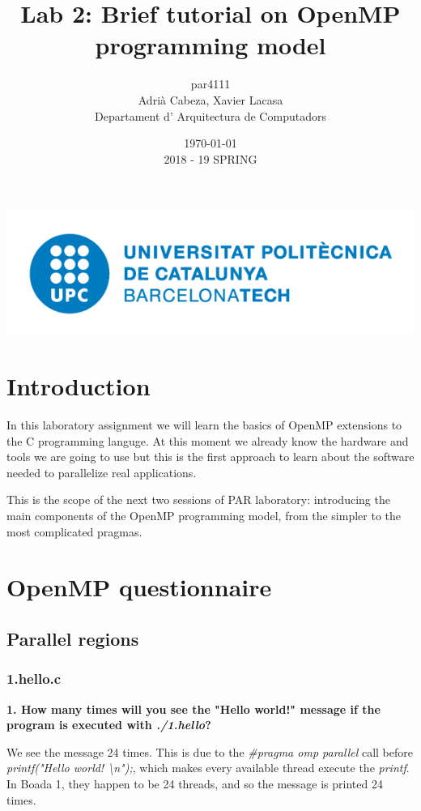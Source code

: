 \documentclass[12]{article}
\author{par4111 \\ Adrià Cabeza, Xavier Lacasa \\ Departament d' Arquitectura de Computadors}
\title{Lab 2: Brief tutorial on OpenMP programming model }
\date{\today \\ 2018 - 19 SPRING}
\begin{document}
\maketitle

\vspace*{\fill}
\begin{center}
\includegraphics[scale=0.5]{images/UPClogo.png}
\end{center}
\newpage
\tableofcontents
\newpage
\section{Introduction}

In this laboratory assignment we will learn the basics of OpenMP extensions to the C programming languge. At this moment we already know the hardware and tools we are going to use but this is the first approach to learn about the software needed to parallelize real applications. 

This is the scope of the next two sessions of PAR laboratory: introducing the  main components of the OpenMP programming model, from the simpler to the most complicated pragmas. 

\section{OpenMP questionnaire}

\subsection{Parallel regions}
\subsubsection{1.hello.c}
\textbf{1. How many times will you see the "Hello world!" message if the program is executed with \textit{./1.hello}?}

We see the message 24 times. This is due to the \textit{\#pragma omp parallel} call before \textit{printf("Hello world! \textbackslash n");}, which makes every available thread execute the \textit{printf}. In Boada 1, they happen to be 24 threads, and so the message is printed 24 times.
\end{document}
